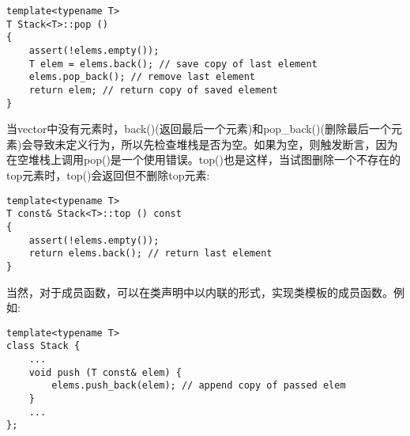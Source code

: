 \begin{lstlisting}[style=styleCXX]
template<typename T>
T Stack<T>::pop ()
{
	assert(!elems.empty());
	T elem = elems.back(); // save copy of last element
	elems.pop_back(); // remove last element
	return elem; // return copy of saved element
}
\end{lstlisting}

当vector中没有元素时，back()(返回最后一个元素)和pop\_back()(删除最后一个元素)会导致未定义行为，所以先检查堆栈是否为空。如果为空，则触发断言，因为在空堆栈上调用pop()是一个使用错误。top()也是这样，当试图删除一个不存在的top元素时，top()会返回但不删除top元素:

\begin{lstlisting}[style=styleCXX]
template<typename T>
T const& Stack<T>::top () const
{
	assert(!elems.empty());
	return elems.back(); // return last element
}
\end{lstlisting}

当然，对于成员函数，可以在类声明中以内联的形式，实现类模板的成员函数。例如:

\begin{lstlisting}[style=styleCXX]
template<typename T>
class Stack {
	...
	void push (T const& elem) {
		elems.push_back(elem); // append copy of passed elem
	}
	...
};
\end{lstlisting}






